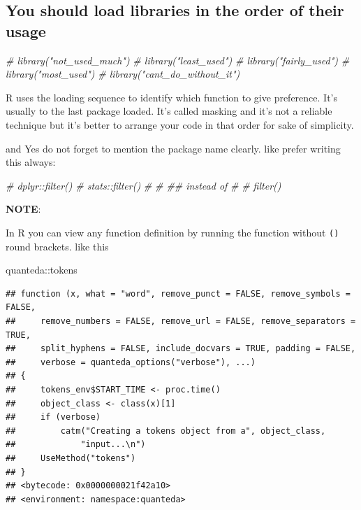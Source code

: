 \documentclass[
]{book}
\newenvironment{Shaded}{\begin{snugshade}}{\end{snugshade}}
\newcommand{\CommentTok}[1]{\textcolor[rgb]{0.56,0.35,0.01}{\textit{#1}}}
\newcommand{\NormalTok}[1]{#1}
\newcommand{\SpecialCharTok}[1]{\textcolor[rgb]{0.00,0.00,0.00}{#1}}
\begin{document}
\hypertarget{you-should-load-libraries-in-the-order-of-their-usage}{%
\subsection{You should load libraries in the order of their usage}\label{you-should-load-libraries-in-the-order-of-their-usage}}

\begin{Shaded}
\begin{Highlighting}[]
\CommentTok{\# library("not\_used\_much")}
\CommentTok{\# library("least\_used")}
\CommentTok{\# library("fairly\_used")}
\CommentTok{\# library("most\_used")}
\CommentTok{\# library("cant\_do\_without\_it")}
\end{Highlighting}
\end{Shaded}

R uses the loading sequence to identify which function to give preference. It's usually to the last package loaded. It's called masking and it's not a reliable technique but it's better to arrange your code in that order for sake of simplicity.

and Yes do not forget to mention the package name clearly. like prefer writing this always:

\begin{Shaded}
\begin{Highlighting}[]
\CommentTok{\# dplyr::filter()}
\CommentTok{\# stats::filter()}
\CommentTok{\# }
\CommentTok{\# \#\# instead of }
\CommentTok{\# }
\CommentTok{\# filter()}
\end{Highlighting}
\end{Shaded}

\textbf{NOTE}:

In R you can view any function definition by running the function without \texttt{()} round brackets. like this

\begin{Shaded}
\begin{Highlighting}[]
\NormalTok{quanteda}\SpecialCharTok{::}\NormalTok{tokens}
\end{Highlighting}
\end{Shaded}

\begin{verbatim}
## function (x, what = "word", remove_punct = FALSE, remove_symbols = FALSE, 
##     remove_numbers = FALSE, remove_url = FALSE, remove_separators = TRUE, 
##     split_hyphens = FALSE, include_docvars = TRUE, padding = FALSE, 
##     verbose = quanteda_options("verbose"), ...) 
## {
##     tokens_env$START_TIME <- proc.time()
##     object_class <- class(x)[1]
##     if (verbose) 
##         catm("Creating a tokens object from a", object_class, 
##             "input...\n")
##     UseMethod("tokens")
## }
## <bytecode: 0x0000000021f42a10>
## <environment: namespace:quanteda>
\end{verbatim}
\end{document}
